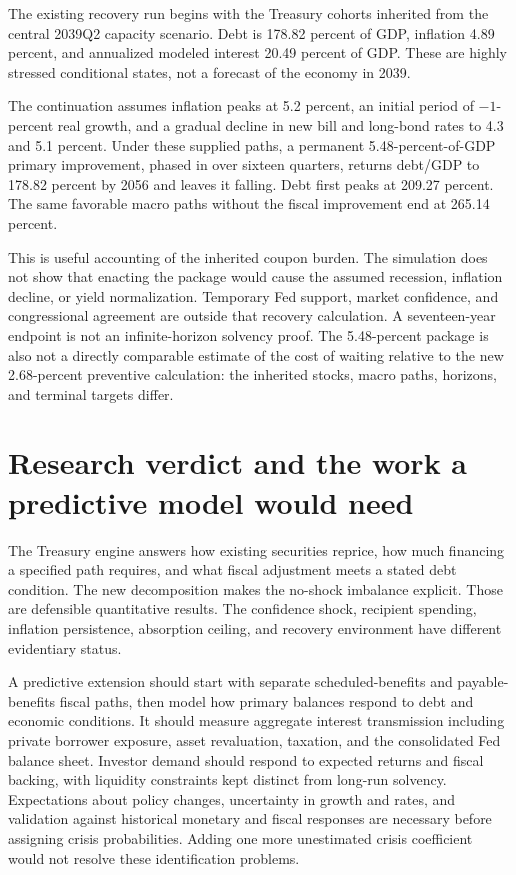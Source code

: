 \documentclass[11pt]{article}
\begin{document}
The existing recovery run begins with the Treasury cohorts inherited from the central
2039Q2 capacity scenario. Debt is 178.82 percent of GDP, inflation 4.89 percent, and
annualized modeled interest 20.49 percent of GDP. These are highly stressed conditional
states, not a forecast of the economy in 2039.

The continuation assumes inflation peaks at 5.2 percent, an initial period of
$-1$-percent real growth, and a gradual decline in new bill and long-bond rates to
4.3 and 5.1 percent. Under these supplied paths, a permanent 5.48-percent-of-GDP primary
improvement, phased in over sixteen quarters, returns debt/GDP to 178.82 percent by 2056
and leaves it falling. Debt first peaks at 209.27 percent. The same favorable macro paths
without the fiscal improvement end at 265.14 percent.

This is useful accounting of the inherited coupon burden. The simulation does not show
that enacting the package would cause the assumed recession, inflation decline, or yield
normalization. Temporary Fed support, market confidence, and congressional agreement are
outside that recovery calculation. A seventeen-year endpoint is not an infinite-horizon
solvency proof. The 5.48-percent package is also not a directly comparable estimate of the
cost of waiting relative to the new 2.68-percent preventive calculation: the inherited
stocks, macro paths, horizons, and terminal targets differ.

\section{Research verdict and the work a predictive model would need}

The Treasury engine answers how existing securities reprice, how much financing a
specified path requires, and what fiscal adjustment meets a stated debt condition.
The new decomposition makes the no-shock imbalance explicit. Those are defensible
quantitative results. The confidence shock, recipient spending, inflation persistence,
absorption ceiling, and recovery environment have different evidentiary status.

A predictive extension should start with separate scheduled-benefits and payable-benefits
fiscal paths, then model how primary balances respond to debt and economic conditions.
It should measure aggregate interest transmission including private borrower exposure,
asset revaluation, taxation, and the consolidated Fed balance sheet. Investor demand
should respond to expected returns and fiscal backing, with liquidity constraints kept
distinct from long-run solvency. Expectations about policy changes, uncertainty in growth
and rates, and validation against historical monetary and fiscal responses are necessary
before assigning crisis probabilities. Adding one more unestimated crisis coefficient
would not resolve these identification problems.
\end{document}
